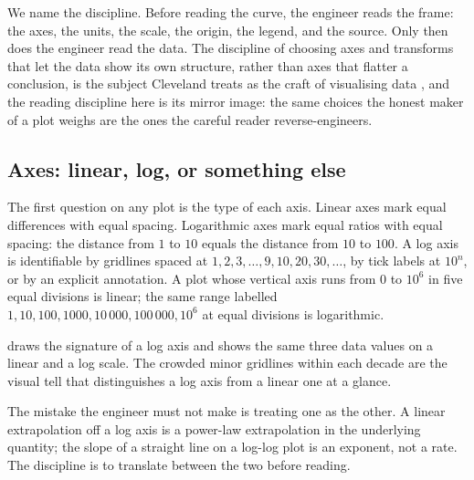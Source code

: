 We name the discipline. Before reading the curve, the engineer reads
the frame: the axes, the units, the scale, the origin, the legend,
and the source. Only then does the engineer read the data. The
discipline of choosing axes and transforms that let the data show its
own structure, rather than axes that flatter a conclusion, is the
subject Cleveland treats as the craft of visualising data
\cite{v2c02-text:cleveland1993}, and the reading discipline here is its
mirror image: the same choices the honest maker of a plot weighs are
the ones the careful reader reverse-engineers.

\subsection{Axes: linear, log, or something else}

The first question on any plot is the type of each axis. Linear axes
mark equal differences with equal spacing. Logarithmic axes mark
equal ratios with equal spacing: the distance from $1$ to $10$ equals
the distance from $10$ to $100$. A log axis is identifiable by gridlines
spaced at $1, 2, 3, \ldots, 9, 10, 20, 30, \ldots$, by tick labels at
$10^{n}$, or by an explicit annotation. A plot whose vertical axis
runs from $0$ to $10^{6}$ in five equal divisions is linear; the same
range labelled $1, 10, 100, 1000, 10\,000, 100\,000, 10^{6}$ at equal
divisions is logarithmic.



 draws the signature of a log
axis and shows the same three data values on a linear and a log
scale. The crowded minor gridlines within each decade are the visual
tell that distinguishes a log axis from a linear one at a glance.

The mistake the engineer must not make is treating one as the other.
A linear extrapolation off a log axis is a power-law extrapolation in
the underlying quantity; the slope of a straight line on a log-log
plot is an exponent, not a rate. The discipline is to translate
between the two before reading.

